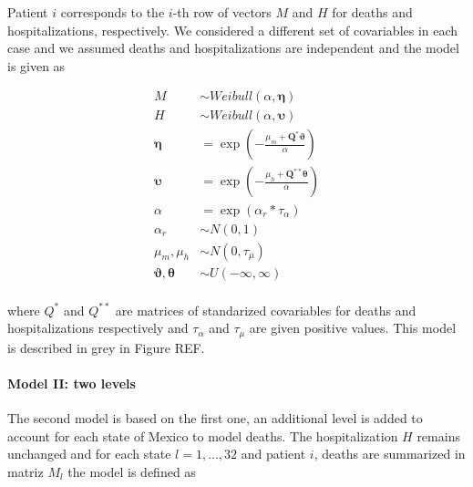 \documentclass[
]{article}
\begin{document}
Patient \(i\) corresponds to the \(i\)-th row of vectors \(M\) and \(H\)
for deaths and hospitalizations, respectively. We considered a different
set of covariables in each case and we assumed deaths and
hospitalizations are independent and the model is given as

\[
\begin{aligned}
 {M}  &\sim Weibull(\alpha,\mathbf{\eta})\\
 {H}  &\sim Weibull(\alpha,\mathbf{\upsilon}) \\
 \mathbf{\eta} &= \exp\left(-\frac{\mu_m+\mathbf{Q}^*\mathbf{\vartheta}}{\alpha}\right) \\
 \mathbf{\upsilon} &= \exp\left(-\frac{\mu_h+\mathbf{Q}^{**}\mathbf{\theta}}{\alpha}\right) \\
 \alpha&=\exp(\alpha_r*\tau_\alpha) \\
 \alpha_r&\sim N(0,1) \\
 \mu_m,\mu_h &\sim N(0,\tau_\mu) \\
 \mathbf{\vartheta},\mathbf{\theta} &\sim U(-\infty,\infty) \\
\end{aligned}
\]

where \(Q^*\) and \(Q^{**}\) are matrices of standarized covariables for
deaths and hospitalizations respectively and \(\tau_\alpha\) and
\(\tau_{\mu}\) are given positive values. This model is described in
grey in Figure REF.

\hypertarget{model-ii-two-levels}{%
\paragraph{Model II: two levels}\label{model-ii-two-levels}}

The second model is based on the first one, an additional level is added
to account for each state of Mexico to model deaths. The hospitalization
\(H\) remains unchanged and for each state \(l= 1,\ldots, 32\) and
patient \(i\), deaths are summarized in matriz \(M_{l}\) the model is
defined as
\end{document}
